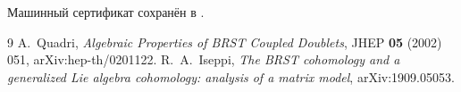 Машинный сертификат сохранён в
.

\begin{thebibliography}{9}
A.~Quadri,
\emph{Algebraic Properties of BRST Coupled Doublets},
JHEP \textbf{05} (2002) 051, arXiv:hep-th/0201122.
R.~A.~Iseppi,
\emph{The BRST cohomology and a generalized Lie algebra cohomology:
analysis of a matrix model},
arXiv:1909.05053.
\end{thebibliography}